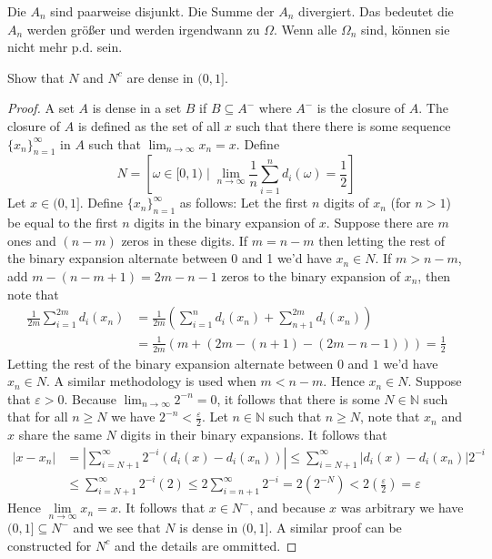 \documentclass[11pt]{article}
\newcommand{\N}{\mathbb{N}}
\newcommand{\seq}{\subseteq}
\newcommand{\e}{\varepsilon}
\newcommand{\Om}{\Omega}
\newcommand{\Lim}{\lim\limits}
\newenvironment{exercise}[2][Exercise]{\begin{trivlist}
\item[\hskip \labelsep {\bfseries #1}\hskip \labelsep {\bfseries #2.}]}{\end{trivlist}}
\newenvironment{reflection}[2][Reflection]{\begin{trivlist}
\item[\hskip \labelsep {\bfseries #1}\hskip \labelsep {\bfseries #2.}]}{\end{trivlist}}
\begin{document}
\begin{reflection}{1.1b}
Die $A_n$ sind paarweise disjunkt. Die Summe der $A_n$ divergiert. Das bedeutet die $A_n$ werden größer und werden irgendwann zu $\Om$. Wenn alle $\Om_n$ sind, können sie nicht mehr p.d. sein.
\end{reflection}

\begin{exercise}{1.2}
    Show that $N$ and $N^c$ are dense in $(0, 1]$.
\end{exercise}
\begin{proof}
    A set $A$ is dense in a set $B$ if $B \seq A^{-}$ where $A^{-}$ is the closure of $A$. The closure of $A$ is defined as the set of all $x$ such that there there is some sequence $\{ x_{n} \}_{n=1}^{\infty}$ in $A$ such that $\lim_{n \to \infty} x_n = x$. Define \[ N = \left [ \omega \in [0, 1) \mid \lim_{n \to \infty} \frac{1}{n} \sum_{i=1}^{n} d_i (\omega) = \frac{1}{2} \right ] \]
    Let $x \in (0, 1]$. Define $\{ x_{n} \}_{n=1}^{\infty}$ as follows: Let the first $n$ digits of $x_n$ (for $n > 1$) be equal to the first $n$ digits in the binary expansion of $x$. Suppose there are $m$ ones and $(n-m)$ zeros in these digits. If $m = n-m$ then letting the rest of the binary expansion alternate between 0 and 1 we'd have $x_n \in N$. If $m > n-m$, add $m-(n-m+1) = 2m - n - 1$ zeros to the binary expansion of $x_n$, then note that
    \begin{align*}
        \frac{1}{2m} \sum_{i=1}^{2m} d_i (x_n) &= \frac{1}{2m} \left (\sum_{i=1}^{n} d_i (x_n) + \sum_{n+1}^{2m} d_i (x_n) \right) \\
        &= \frac{1}{2m} \left ( m + (2m-(n+1) - (2m-n-1)) \right ) = \frac{1}{2}
    \end{align*}
    Letting the rest of the binary expansion alternate between $0$ and $1$ we'd have $x_n \in N$. A similar methodology is used when $m < n-m$. Hence $x_n \in N$. Suppose that $\e > 0$. Because $\lim_{n \to \infty} 2^{-n} = 0$, it follows that there is some $N \in \N$ such that for all $n \geq N$ we have $2^{-n} < \frac{\e}{2}$. Let $n \in \N$ such that $n \geq N$, note that $x_n$ and $x$ share the same $N$ digits in their binary expansions. It follows that
    \begin{align*}
        |x-x_n| &= \left | \sum_{i=N+1}^{\infty} 2^{-i}  (d_i (x) - d_i(x_n))\right | \leq \sum_{i=N+1}^{\infty} |d_i (x) - d_i (x_n)| 2^{-i} \\
        &\leq \sum_{i=N+1}^{\infty} 2^{-i} (2) \leq 2 \sum_{i=n+1}^{\infty} 2^{-i} = 2(2^{-N}) < 2 \left (\frac{\e}{2} \right) = \e
    \end{align*}
    Hence $\Lim_{n \to \infty} x_n = x$. It follows that $x \in N^{-}$, and because $x$ was arbitrary we have $(0, 1] \seq N^{-}$ and we see that $N$ is dense in $(0, 1]$. A similar proof can be constructed for $N^{c}$ and the details are ommitted.
\end{proof}
\end{document}
